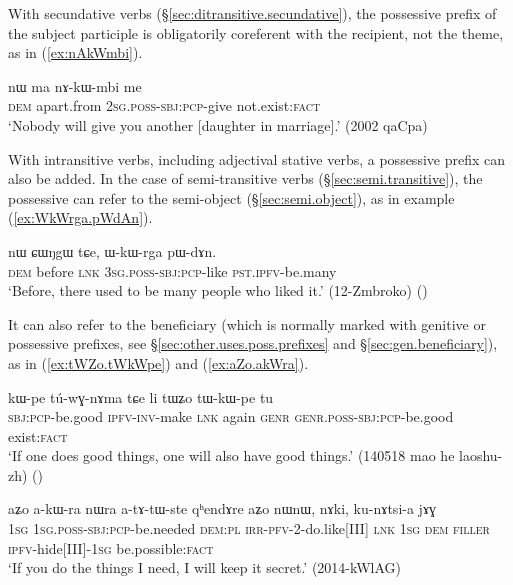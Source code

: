 With secundative verbs (§\ref{sec:ditransitive.secundative}), the possessive prefix of the subject participle is obligatorily coreferent with the recipient, not the theme, as in (\ref{ex:nAkWmbi}).

\begin{exe}
\ex \label{ex:nAkWmbi}
\gll nɯ ma nɤ-kɯ-mbi me \\
\textsc{dem} apart.from \textsc{2sg}.\textsc{poss}-\textsc{sbj}:\textsc{pcp}-give not.exist:\textsc{fact} \\
\glt `Nobody will give you another [daughter in marriage].' (2002 qaCpa)
\end{exe}
With intransitive verbs, including adjectival stative verbs, a possessive prefix can also be added. In the case of semi-transitive verbs (§\ref{sec:semi.transitive}), the possessive can refer to the semi-object (§\ref{sec:semi.object}), as in example (\ref{ex:WkWrga.pWdAn}).

 \begin{exe} 
\ex \label{ex:WkWrga.pWdAn}
\gll  nɯ ɕɯŋgɯ tɕe, ɯ-kɯ-rga pɯ-dɤn. \\
\textsc{dem} before \textsc{lnk} \textsc{3sg}.\textsc{poss}-\textsc{sbj}:\textsc{pcp}-like \textsc{pst}.\textsc{ipfv}-be.many \\
\glt  `Before, there used to be many people who liked it.' (12-Zmbroko)
()
\end{exe}

It can also refer to the beneficiary (which is normally marked with genitive or possessive prefixes, see §\ref{sec:other.uses.poss.prefixes} and §\ref{sec:gen.beneficiary}), as in (\ref{ex:tWZo.tWkWpe}) and (\ref{ex:aZo.akWra}).

 \begin{exe} 
\ex \label{ex:tWZo.tWkWpe}
\gll  kɯ-pe tú-wɣ-nɤma tɕe li tɯʑo tɯ-kɯ-pe tu \\
\textsc{sbj}:\textsc{pcp}-be.good \textsc{ipfv}-\textsc{inv}-make \textsc{lnk} again \textsc{genr} \textsc{genr}.\textsc{poss}-\textsc{sbj}:\textsc{pcp}-be.good exist:\textsc{fact} \\
\glt  `If one does good things, one will also have good things.' (140518 mao he laoshu-zh)
()
\end{exe}

 \begin{exe} 
\ex \label{ex:aZo.akWra}
\gll  aʑo a-kɯ-ra nɯra a-tɤ-tɯ-ste qʰendɤre aʑo nɯnɯ, nɤki, ku-nɤtsi-a jɤɣ \\
\textsc{1sg} \textsc{1sg}.\textsc{poss}-\textsc{sbj}:\textsc{pcp}-be.needed \textsc{dem}:\textsc{pl} \textsc{irr}-\textsc{pfv}-2-do.like[III] \textsc{lnk} \textsc{1sg} \textsc{dem} \textsc{filler} \textsc{ipfv}-hide[III]-\textsc{1sg} be.possible:\textsc{fact}  \\
\glt  `If you do the things I need, I will keep it secret.'  (2014-kWlAG)
\end{exe}

